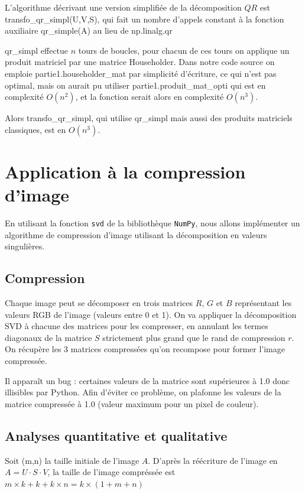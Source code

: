 \documentclass{article}
\begin{document}
L'algorithme décrivant une version simplifiée de la décomposition $QR$ est transfo\_qr\_simpl(U,V,S), qui fait un nombre d'appels constant à la fonction auxiliaire qr\_simple(A) au lieu de np.linalg.qr

qr\_simpl effectue $n$ tours de boucles, pour chacun de ces tours on applique un produit matriciel par une matrice Householder. Dans notre code source on emploie partie1.householder\_mat par simplicité d'écriture, ce qui n'est pas optimal,
mais on aurait pu utiliser partie1.produit\_mat\_opti qui est en complexité $O(n^2)$, et la fonction serait alors en complexité $O(n^3)$.

Alors transfo\_qr\_simpl, qui utilise qr\_simpl mais aussi des produits matriciels classiques, est en $O(n^3)$.


\section{Application à la compression d'image}
\label{sec:appli_compr_img}

En utilisant la fonction \verb|svd| de la bibliothèque \verb|NumPy|, nous allons implémenter un algorithme de compression d'image utilisant
la décomposition en valeurs singulières.

\subsection{Compression}
\label{ssec:compr_img}

Chaque image peut se décomposer en trois matrices $R$, $G$ et $B$ représentant les valeurs RGB de l'image (valeurs entre 0 et 1).
On va appliquer la décomposition SVD à chacune des matrices pour les compresser, en annulant les termes diagonaux
de la matrice $S$ strictement plus grand que le rand de compression $r$. On récupère les 3 matrices compressées qu'on
recompose pour former l'image compressée. 

Il apparaît un bug : certaines valeurs de la matrice sont supérieures à 1.0 donc illisibles par Python. 
Afin d'éviter ce problème, on plafonne les valeurs de la matrice compressée à 1.0 (valeur maximum pour un pixel de couleur).

\subsection{Analyses quantitative et qualitative}
\label{ssec:quanti_img}

Soit (m,n) la taille initiale de l'image $A$.
D'après la réécriture de l'image en $A = U \cdot S \cdot V$,
la taille de l'image compréssée est $m \times k + k + k \times n = k \times (1+m+n)$
\end{document}
